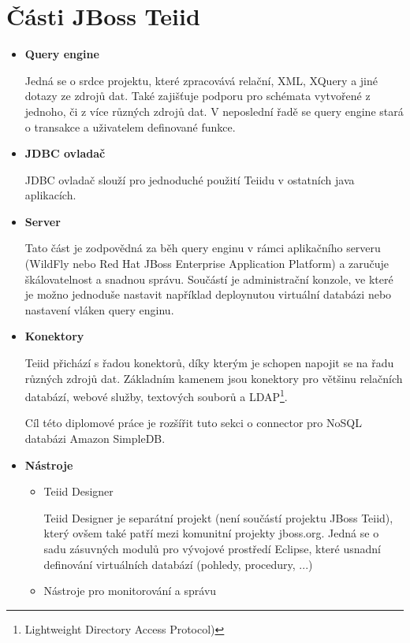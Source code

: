 \documentclass[oneside,11pt]{fithesis2}
\begin{document}
\section{Části JBoss Teiid}
\begin{itemize}
 \item \textbf{Query engine}
 
 Jedná se o srdce projektu, které zpracovává relační, XML, XQuery a jiné dotazy ze zdrojů dat. Také zajišťuje podporu pro schémata vytvořené z jednoho, či z více různých zdrojů dat. V neposlední řadě se query engine stará o transakce a uživatelem definované funkce.
 
 \item \textbf{JDBC ovladač}
 
 JDBC ovladač slouží pro jednoduché použití Teiidu v ostatních java aplikacích.
 
 \item \textbf{Server}
 
 Tato část je zodpovědná za běh query enginu v rámci aplikačního serveru (WildFly nebo Red Hat JBoss Enterprise Application Platform) a zaručuje škálovatelnost a snadnou správu. Součástí je administrační konzole, ve které je možno jednoduše nastavit například deploynutou virtuální databázi nebo nastavení vláken query enginu.
 
 \item \textbf{Konektory}
 
 Teiid přichází s řadou konektorů, díky kterým je schopen napojit se na řadu různých zdrojů dat. Základním kamenem jsou konektory pro většinu relačních databází, webové služby, textových souborů a LDAP\footnote{Lightweight Directory Access Protocol)}.
 
 Cíl této diplomové práce je rozšířit tuto sekci o connector pro NoSQL databázi Amazon SimpleDB.
 
 \item \textbf{Nástroje}
 
  \begin{itemize}
  \item Teiid Designer
  
  Teiid Designer je separátní projekt (není součástí projektu JBoss Teiid), který ovšem také patří mezi komunitní projekty jboss.org. Jedná se o sadu zásuvných modulů pro vývojové prostředí Eclipse, které usnadní definování virtuálních databází (pohledy, procedury, ...)
  
  \item Nástroje pro monitorování a správu
  

\end{itemize}
\end{itemize}
\end{document}
